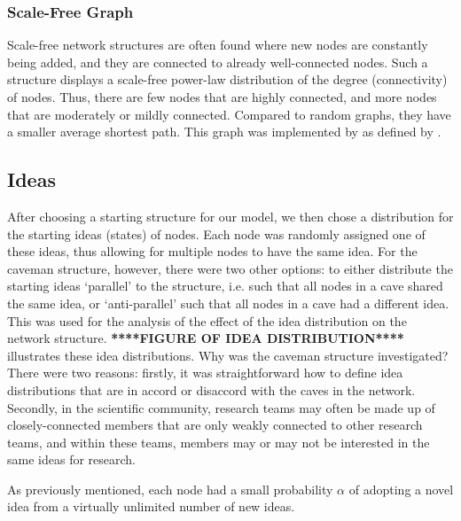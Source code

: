 \subsubsection{Scale-Free Graph}

Scale-free network structures are often found where new nodes are constantly being added, and they are connected to already well-connected nodes. Such a structure displays a scale-free power-law distribution of the degree (connectivity) of nodes. Thus, there are few nodes that are highly connected, and more nodes that are moderately or mildly connected. Compared to random graphs, they have a smaller average shortest path. This graph was implemented by \citet*{BS2011} as defined by \citet*{BA1999}.


\subsection{Ideas}

After choosing a starting structure for our model, we then chose a distribution for the starting ideas (states) of nodes. Each node was randomly assigned one of these ideas, thus allowing for multiple nodes to have the same idea. For the caveman structure, however, there were two other options: to either distribute the starting ideas `parallel' to the structure, i.e. such that all nodes in a cave shared the same idea, or `anti-parallel' such that all nodes in a cave had a different idea. This was used for the analysis of the effect of the idea distribution on the network structure. \textbf{****FIGURE OF IDEA DISTRIBUTION****} illustrates these idea distributions. Why was the caveman structure investigated? There were two reasons: firstly, it was straightforward how to define idea distributions that are in accord or disaccord with the caves in the network. Secondly, in the scientific community, research teams may often be made up of closely-connected members that are only weakly connected to other research teams, and within these teams, members may or may not be interested in the same ideas for research. 

As previously mentioned, each node had a small probability $\alpha$ of adopting a novel idea from a virtually unlimited number of new ideas.
